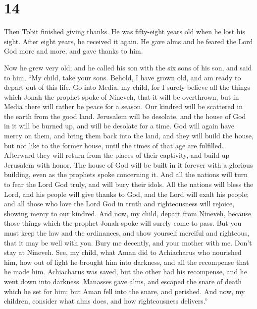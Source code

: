\hypertarget{section-13}{%
\section{14}\label{section-13}}

 Then Tobit finished giving thanks.  He was
fifty-eight years old when he lost his sight. After eight years, he
received it again. He gave alms and he feared the Lord God more and
more, and gave thanks to him.

 Now he grew very old; and he called his son with the six
sons of his son, and said to him, ``My child, take your sons. Behold, I
have grown old, and am ready to depart out of this life. 
Go into Media, my child, for I surely believe all the things which Jonah
the prophet spoke of Nineveh, that it will be overthrown, but in Media
there will rather be peace for a season. Our kindred will be scattered
in the earth from the good land. Jerusalem will be desolate, and the
house of God in it will be burned up, and will be desolate for a time.
 God will again have mercy on them, and bring them back
into the land, and they will build the house, but not like to the former
house, until the times of that age are fulfilled. Afterward they will
return from the places of their captivity, and build up Jerusalem with
honor. The house of God will be built in it forever with a glorious
building, even as the prophets spoke concerning it.  And
all the nations will turn to fear the Lord God truly, and will bury
their idols.  All the nations will bless the Lord, and his
people will give thanks to God, and the Lord will exalt his people; and
all those who love the Lord God in truth and righteousness will rejoice,
showing mercy to our kindred.  And now, my child, depart
from Nineveh, because those things which the prophet Jonah spoke will
surely come to pass.  But you must keep the law and the
ordinances, and show yourself merciful and righteous, that it may be
well with you.  Bury me decently, and your mother with
me. Don't stay at Nineveh. See, my child, what Aman did to Achiacharus
who nourished him, how out of light he brought him into darkness, and
all the recompense that he made him. Achiacharus was saved, but the
other had his recompense, and he went down into darkness. Manasses gave
alms, and escaped the snare of death which he set for him; but Aman fell
into the snare, and perished.  And now, my children,
consider what alms does, and how righteousness delivers.''

